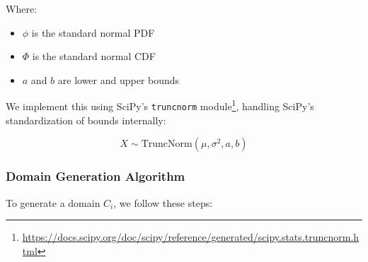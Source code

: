 Where:
\begin{itemize}
      \item $\phi$ is the standard normal PDF
      \item $\Phi$ is the standard normal CDF
      \item $a$ and $b$ are lower and upper bounds
\end{itemize}

We implement this using SciPy's \texttt{truncnorm} module\footnote{\url{https://docs.scipy.org/doc/scipy/reference/generated/scipy.stats.truncnorm.html}},
handling SciPy's standardization of bounds internally:

\begin{equation*}
      X \sim \text{TruncNorm}(\mu, \sigma^2, a, b)
\end{equation*}

\subsubsection{Domain Generation Algorithm}

To generate a domain $C_i$, we follow these steps:


